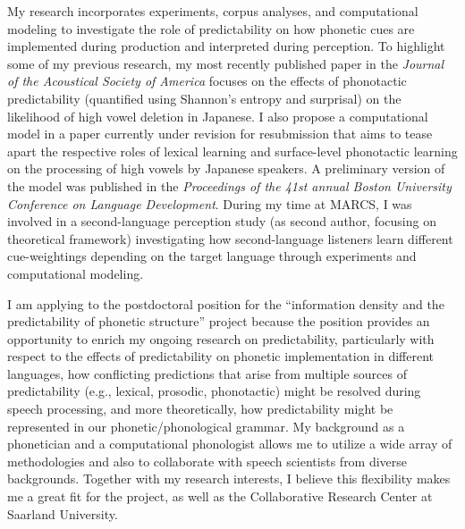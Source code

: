 \documentclass[a4paper,11pt]{article}
\begin{document}
\noindent My research incorporates experiments, corpus analyses, and computational modeling to investigate the role of predictability on how phonetic cues are implemented during production and interpreted during perception. To highlight some of my previous research, my most recently published paper in the \textit{Journal of the Acoustical Society of America} focuses on the effects of phonotactic predictability (quantified using Shannon's entropy and surprisal) on the likelihood of high vowel deletion in Japanese. %
I also propose a computational model in a paper currently under revision for resubmission that aims to tease apart the respective roles of lexical learning and surface-level phonotactic learning on the processing of high vowels by Japanese speakers. A preliminary version of the model was published in the \textit{Proceedings of the 41st annual Boston University Conference on Language Development}. During my time at MARCS, I was involved in a second-language perception study (as second author, focusing on theoretical framework) investigating how second-language listeners learn different cue-weightings depending on the target language through experiments and computational modeling. 

\vspace{2mm}

\noindent I am applying to the postdoctoral position for the ``information density and the predictability of phonetic structure'' project because the position provides an opportunity to enrich my ongoing research on predictability, particularly with respect to the effects of predictability on phonetic implementation in different languages, how conflicting predictions that arise from multiple sources of predictability (e.g., lexical, prosodic, phonotactic) might be resolved during speech processing, and more theoretically, how predictability might be represented in our phonetic/phonological grammar. My background as a phonetician and a computational phonologist allows me to utilize a wide array of methodologies and also to collaborate with speech scientists from diverse backgrounds. Together with my research interests, I believe this flexibility makes me a great fit for the project, as well as the Collaborative Research Center at Saarland University.

\vspace{2mm}
\end{document}
